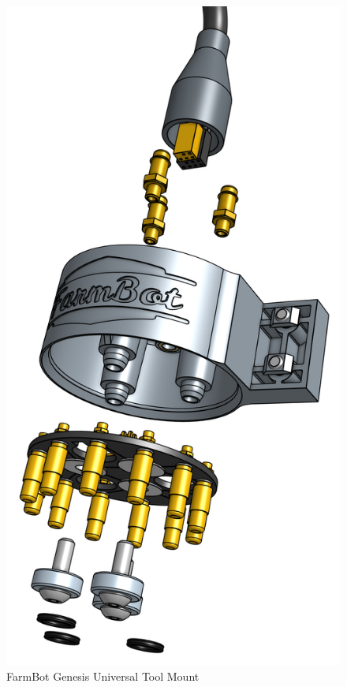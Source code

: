 \begin{figure}[H]
    \centering
\includegraphics[scale=0.1]{./Figures/farmbot_hardware.png}
\caption{FarmBot Genesis Universal Tool Mount}
\end{figure}

